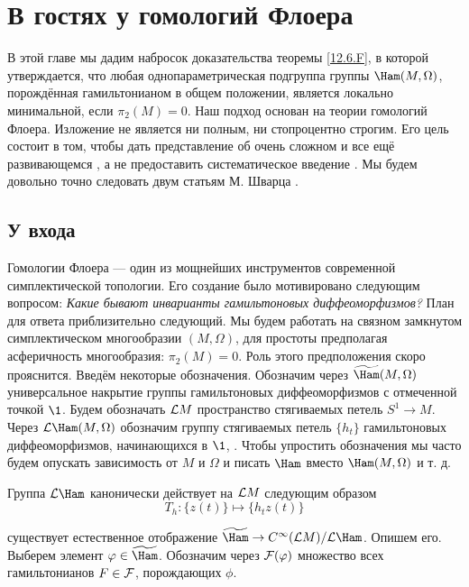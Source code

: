 \chapter[Гомологии Флоера]{В гостях у гомологий Флоера}\label{13}

В этой главе мы дадим набросок доказательства теоремы
\ref{12.6.F}, в которой утверждается, что любая однопараметрическая
подгруппа группы $\Ham(M, \Omega)$, порождённая гамильтонианом в общем
положении, является локально минимальной, если $π_{2}(M) = 0$.
Наш подход основан на теории гомологий Флоера.
Изложение не является
ни полным, ни стопроцентно строгим.
Его цель состоит в том, чтобы дать представление об очень сложном и
все ещё развивающемся , а не
предоставить систематическое введение .
Мы будем довольно точно следовать двум статьям М. Шварца \cite{Sch2,
  Sch3}.

\section{У входа}\label{13.1}

Гомологии Флоера --- один из мощнейших инструментов современной
симплектической топологии. 
Его создание было мотивировано следующим вопросом:
\textit{Какие бывают инварианты гамильтоновых диффеоморфизмов?}
План для ответа приблизительно следующий.
Мы будем работать на связном замкнутом симплектическом многообразии
$(M,\Omega)$, для простоты предполагая асферичность многообразия:
$π_{2}(M) = 0$.
Роль этого предположения скоро прояснится.
Введём некоторые обозначения.
Обозначим через $\widetilde\Ham(M,\Omega)$ универсальное накрытие
группы гамильтоновых диффеоморфизмов с отмеченной точкой $\1$.
Будем обозначать $\mathcal{L} M$ пространство стягиваемых петель $S^{1}\to
M$.
Через $\L\Ham(M,\Omega)$ обозначим группу стягиваемых петель
$\{h_{t}\}$ гамильтоновых 
диффеоморфизмов, 
начинающихся в $\1$,
.
Чтобы упростить обозначения мы часто будем опускать зависимость от $M$
и $\Omega$ и писать $\Ham$ вместо $\Ham(M, \Omega)$ и т. д. 

Группа $\L\Ham$ канонически действует на $\mathcal{L} M$
следующим образом\?{}{+$\{\}$}
\[
T_{h}: \{z(t)\}\mapsto \{h_{t}z(t)\}
\]

  
 существует естественное
отображение $\widetilde\Ham\z\to C^{\infty}(\L M)/\L\Ham$.
Опишем его.
Выберем элемент $\phi\in\widetilde\Ham$.
Обозначим
через $\mathcal{F}(\varphi)$ множество всех гамильтонианов $F\in\mathcal{F}$,
порождающих $\phi$.

